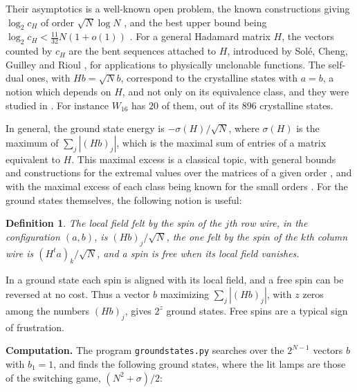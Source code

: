 \documentclass[11pt,a4paper]{article}
\newtheorem{defn}[thm]{Definition}
\theoremstyle{remark}
\begin{document}
\medskip

Their asymptotics is a well-known open problem, the known constructions giving $\log_2c_H$ of order $\sqrt N\log N$ \cite{ptt,tok}, and the best upper bound being $\log_2c_H<\frac{11}{32}N(1+o(1))$ \cite{pot}. For a general Hadamard matrix $H$, the vectors counted by $c_H$ are the bent sequences attached to $H$, introduced by Sol\'e, Cheng, Guilley and Rioul \cite{scg}, for applications to physically unclonable functions. The self-dual ones, with $Hb=\sqrt Nb$, correspond to the crystalline states with $a=b$, a notion which depends on $H$, and not only on its equivalence class, and they were studied in \cite{slc}. For instance $W_{16}$ has $20$ of them, out of its $896$ crystalline states.

In general, the ground state energy is $-\sigma(H)/\sqrt N$, where $\sigma(H)$ is the maximum of $\sum_j|(Hb)_j|$, which is the maximal sum of entries of a matrix equivalent to $H$. This maximal excess is a classical topic, with general bounds and constructions for the extremal values over the matrices of a given order \cite{bes,fko,kha}, and with the maximal excess of each class being known for the small orders \cite{ckh}. For the ground states themselves, the following notion is useful:

\begin{samepage}
\begin{defn}
The local field felt by the spin of the $j$th row wire, in the configuration $(a,b)$, is $(Hb)_j/\sqrt N$, the one felt by the spin of the $k$th column wire is $(H^ta)_k/\sqrt N$, and a spin is free when its local field vanishes.
\end{defn}
\end{samepage}

In a ground state each spin is aligned with its local field, and a free spin can be reversed at no cost. Thus a vector $b$ maximizing $\sum_j|(Hb)_j|$, with $z$ zeros among the numbers $(Hb)_j$, gives $2^z$ ground states. Free spins are a typical sign of frustration.

\medskip

\noindent\textbf{Computation.} The program \texttt{groundstates.py} searches over the $2^{N-1}$ vectors $b$ with $b_1=1$, and finds the following ground states, where the lit lamps are those of the switching game, $(N^2+\sigma)/2$:

\medskip
\end{document}
